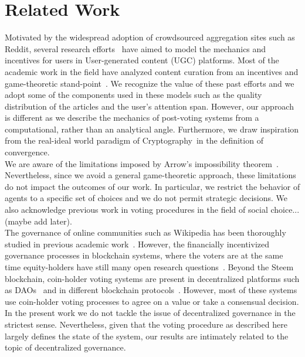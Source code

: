 \section{Related Work}
  Motivated by the widespread adoption of crowdsourced aggregation sites such as Reddit, several research efforts~\cite{askalidis2013theoretical, ghosh2011incentivizing,may2014filter} have aimed to model the mechanics and incentives for users in User-generated content (UGC) platforms.
   Most of the academic work in the field have analyzed content curation from an incentives and game-theoretic stand-point~\cite{ghosh2011incentivizing,das2010ranking,gupte2009news,may2014filter}. We recognize the value of these past efforts and we adopt some of the components used in these models such as the quality distribution of the articles and the user's attention span.
    However, our approach is different as we describe the mechanics of post-voting systems from a computational, rather than an analytical angle. Furthermore, we draw inspiration from the real-ideal world paradigm of Cryptography~\cite{lindell}in the definition of convergence.\\
  
  We are aware of the limitations imposed by Arrow's impossibility theorem~\cite{arrow1950difficulty}. Nevertheless, since we avoid a general game-theoretic approach, these limitations do not impact the outcomes of our work.
  In particular, we restrict the behavior of agents to a specific set of choices and we do not permit strategic decisions. We also acknowledge previous work in voting procedures in the field of social choice...(maybe add later).
   \\


  The governance of online communities such as Wikipedia has been thoroughly studied in previous academic work~\cite{leskovec2010governance,forte2008scaling}. However, the financially incentivized governance processes in blockchain systems, where the voters are at the same time equity-holders have still many open research questions~\cite{vitalik,ehrsam}.
   Beyond the Steem blockchain, coin-holder voting systems are present in decentralized platforms such as DAOs~\cite{darkdaos} and in different blockchain protocols~\cite{tezos}. However, most of these systems use coin-holder voting processes to agree on a value or take a consensual decision.
    In the present work we do not tackle the issue of decentralized governance in the strictest sense. Nevertheless, given that the voting procedure as described here largely defines the state of the system, our results are intimately related to the topic of decentralized governance.
  
  
